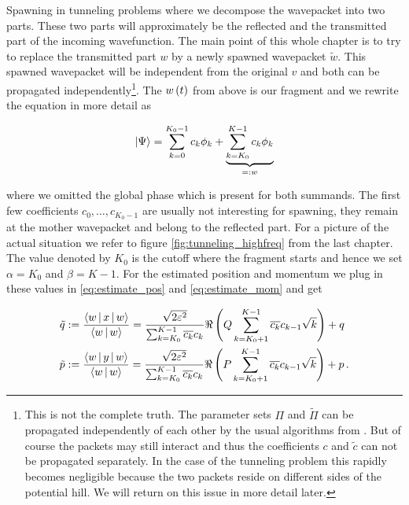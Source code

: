 \begin{chapter}{Spawning in tunneling problems}
where we decompose the wavepacket into two parts. These two parts will approximately
be the reflected and the transmitted part of the incoming wavefunction. The main
point of this whole chapter is to try to replace the transmitted part $w$ by a newly
spawned wavepacket $\tilde{w}$. This spawned wavepacket will be independent from
the original $v$ and both can be propagated independently\footnote{This is not the
complete truth. The parameter sets $\Pi$ and $\tilde{\Pi}$ can be propagated independently
of each other by the usual algorithms from \cite{FGL_semiclassical_dynamics}. But
of course the packets may still interact and thus the coefficients $c$ and $\tilde{c}$
can not be propagated separately. In the case of the tunneling problem this rapidly
becomes negligible because the two packets reside on different sides of the potential
hill. We will return on this issue in more detail later.}.
The $w\left( t \right)$ from above is our fragment and we rewrite the equation in more detail as

\begin{equation}
  \Ket{\Psi} = \sum_{k=0}^{K_0-1} c_k \phi_k + \underbrace{\sum_{k=K_0}^{K-1} c_k \phi_k}_{=: w}
\end{equation}

where we omitted the global phase which is present for both summands.
The first few coefficients $c_0, \ldots, c_{K_0-1}$ are usually not interesting for
spawning, they remain at the mother wavepacket and belong to the reflected part.
For a picture of the actual situation we refer to figure \ref{fig:tunneling_highfreq}
from the last chapter. The value denoted by $K_0$ is the cutoff where the fragment
starts and hence we set $\alpha = K_0$ and $\beta = K-1$. For the estimated position
and momentum we plug in these values in \eqref{eq:estimate_pos} and \eqref{eq:estimate_mom}
and get

\begin{align}
  \tilde{q} & := \frac{\Braket{w | x | w}}{\Braket{w|w}}
            = \frac{\sqrt{2 \varepsilon^2}}{\sum_{k=K_0}^{K-1} \overline{c_k} c_k} \Re \left(Q \sum_{k=K_0+1}^{K-1} \overline{c_k} c_{k-1} \sqrt{k} \right) + q 
            \label{eq:estimate_pos_tunnel} \\
  \tilde{p} & := \frac{\Braket{w | y | w}}{\Braket{w|w}}
            = \frac{\sqrt{2 \varepsilon^2}}{\sum_{k=K_0}^{K-1} \overline{c_k} c_k} \Re \left(P \sum_{k=K_0+1}^{K-1} \overline{c_k} c_{k-1} \sqrt{k} \right) + p \,.
            \label{eq:estimate_mom_tunnel}
\end{align}


\end{chapter}
